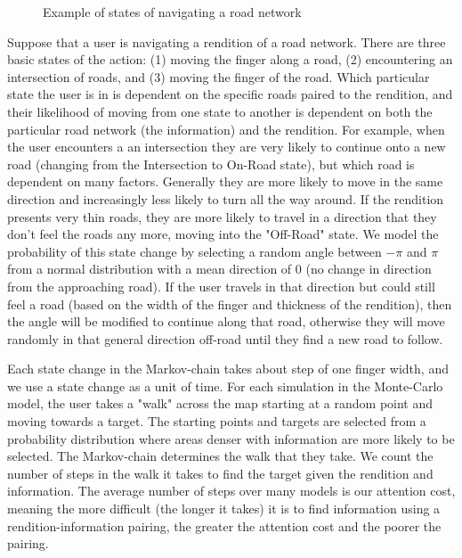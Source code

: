 \begin{description}
\begin{figure}
\caption{Example of states of navigating a road network}
\end{figure}

Suppose that a user is navigating a rendition of a road network. There are three basic states of the action: (1) moving the finger along a road, (2) encountering an intersection of roads, and (3) moving the finger of the road. Which particular state the user is in is dependent on the specific roads paired to the rendition, and their likelihood of moving from one state to another is dependent on both the particular road network (the information) and the rendition. For example, when the user encounters a an intersection they are very likely to continue onto a new road (\eg changing from the Intersection to On-Road state), but which road is dependent on many factors. Generally they are more likely to move in the same direction and increasingly less likely to turn all the way around. If the rendition presents very thin roads, they are more likely to travel in a direction that they don't feel the roads any more, moving into the "Off-Road" state. We model the probability of this state change by selecting a random angle between $-\pi$ and $\pi$ from a normal distribution with a mean direction of 0 (no change in direction from the approaching road). If the user travels in that direction but could still feel a road (based on the width of the finger and thickness of the rendition), then the angle will be modified to continue along that road, otherwise they will move randomly in that general direction off-road until they find a new road to follow.  

Each state change in the Markov-chain takes about step of one finger width, and we use a state change as a unit of time. For each simulation in the Monte-Carlo model, the user takes a "walk" across the map starting at a random point and moving towards a target. The starting points and targets are selected from a probability distribution where areas denser with information are more likely to be selected. The Markov-chain determines the walk that they take. We count the number of steps in the walk it takes to find the target given the rendition and information. The average number of steps over many models is our attention cost, meaning the more difficult (the longer it takes) it is to find information using a rendition-information pairing, the greater the attention cost and the poorer the pairing. 


\end{description}
